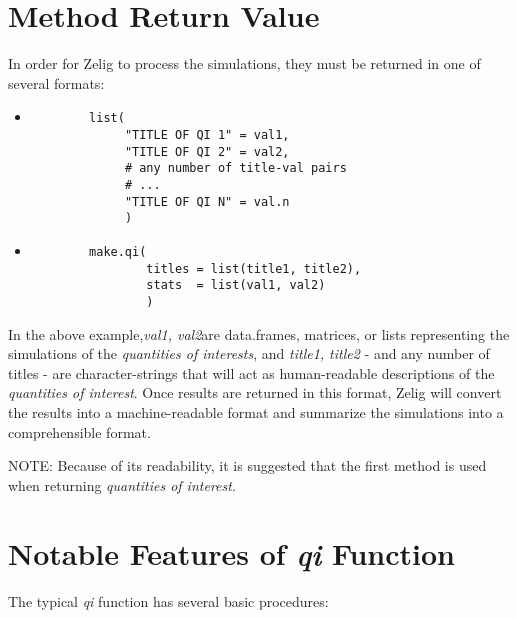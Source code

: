 \section{ Method Return Value}
In order for Zelig to process the simulations, they must be returned in one of several formats:

\begin{itemize}
	\item{\begin{verbatim}
		list(
		     "TITLE OF QI 1" = val1,
		     "TITLE OF QI 2" = val2,
		     # any number of title-val pairs
		     # ...
		     "TITLE OF QI N" = val.n
		     )
	\end{verbatim}}

	\item{\begin{verbatim}
		make.qi(
		        titles = list(title1, title2),
		        stats  = list(val1, val2)
		        )
	\end{verbatim}}
\end{itemize}


In the above example,\emph{val1, val2}are data.frames, matrices, or lists representing
the simulations of the \emph{quantities of interests}, and \emph{title1, title2} - and
any number of titles - are character-strings that will act as human-readable descriptions
of the \emph{quantities of interest}.  Once results are returned in this format, Zelig
will convert the results into a machine-readable format and summarize the simulations
into a comprehensible format.

NOTE: Because of its readability, it is suggested that the first method is used when
returning \emph{quantities of interest}.



%
%
\section{Notable Features of \emph{qi} Function}

The typical \emph{qi} function has several basic procedures:

